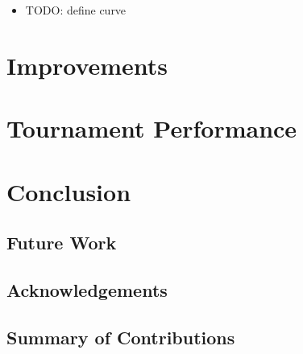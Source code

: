 \documentclass[titlepage]{article}
\begin{document}
\begin{itemize}
    \item TODO: define curve
\end{itemize}


\section{Improvements}


\section{Tournament Performance}


\section{Conclusion}

\subsection{Future Work}

\subsection{Acknowledgements}

\subsection{Summary of Contributions}
\end{document}
